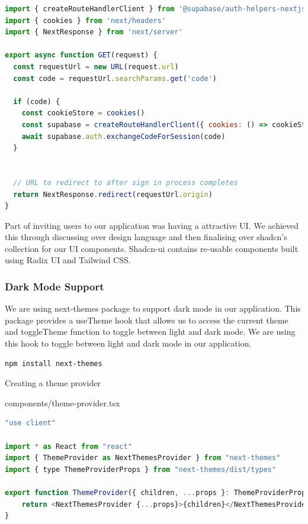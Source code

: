\begin{lstlisting}[language=javascript, caption={Callback Route Handler}]
import { createRouteHandlerClient } from '@supabase/auth-helpers-nextjs'
import { cookies } from 'next/headers'
import { NextResponse } from 'next/server'

export async function GET(request) {
  const requestUrl = new URL(request.url)
  const code = requestUrl.searchParams.get('code')

  if (code) {
    const cookieStore = cookies()
    const supabase = createRouteHandlerClient({ cookies: () => cookieStore })
    await supabase.auth.exchangeCodeForSession(code)
  }


  // URL to redirect to after sign in process completes
  return NextResponse.redirect(requestUrl.origin)
}
\end{lstlisting}
\clearpage
Part of inviting users to our application was having a attractive UI. We achieved this
through discussing over design language and then finalising over shadcn's collection for our UI components. Shadcn-ui contains re-usable components built using Radix UI and Tailwind CSS.

\subsubsection{Dark Mode Support}
We are using next-themes package to support dark mode in our application. This package provides a useTheme hook that allows us to access the current theme and toggleTheme function to toggle between light and dark mode. We are using this hook to toggle between light and dark mode in our application.

\begin{lstlisting}[language=bash, caption={Installing next-themes}]
    npm install next-themes    
\end{lstlisting}

\noindent Creating a theme provider\par\medskip\noindent
components/theme-provider.tsx

\begin{lstlisting}[language=javascript, caption={Theme Provider}]
"use client"

import * as React from "react"
import { ThemeProvider as NextThemesProvider } from "next-themes"
import { type ThemeProviderProps } from "next-themes/dist/types"
    
export function ThemeProvider({ children, ...props }: ThemeProviderProps) {
    return <NextThemesProvider {...props}>{children}</NextThemesProvider>
}
    
\end{lstlisting}

